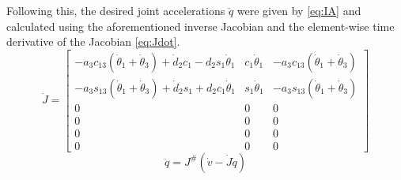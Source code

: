 \documentclass[letterpaper,12pt]{report}
\begin{document}
Following this, the desired joint accelerations $\ddot q$ were given by \eqref{eq:IA} and calculated
using the aforementioned inverse Jacobian and the element-wise time derivative
of the Jacobian \eqref{eq:Jdot}.
\begin{equation} \label{eq:Jdot}
\dot J = 
	\begin{bmatrix}
		-a_3c_{13}(\dot\theta_1+\dot\theta_3)+\dot d_2c_1-d_2s_1\dot\theta_1&c_1\dot\theta_1&-a_3c_{13}(\dot\theta_1+\dot\theta_3)\\
		-a_3s_{13}(\dot\theta_1+\dot\theta_3)+\dot d_2s_1+d_2c_1\dot\theta_1&s_1\dot\theta_1&-a_3s_{13}(\dot\theta_1+\dot\theta_3)\\
		0&0&0\\
		0&0&0\\
		0&0&0\\
		0&0&0
	\end{bmatrix}
\end{equation}
\begin{equation} \label{eq:IA}
\ddot q = J^\#(\dot v - \dot J \dot q)
\end{equation}
\end{document}

